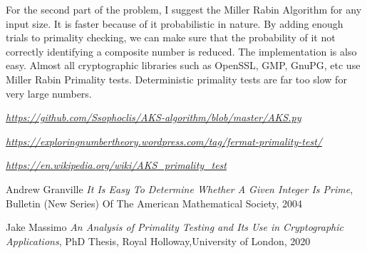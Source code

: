 \documentclass[11pt,a4paper]{article}
\begin{document}
\begin{enumerate}[1.]
\begin{flushleft}
            \bigbreak
            For the second part of the problem, I suggest the Miller Rabin Algorithm for any input size. It is faster because of it probabilistic in nature. By adding enough trials to primality checking, we can make sure that the probability of it not correctly identifying a composite number is reduced. The implementation is also easy. Almost all cryptographic libraries such as OpenSSL, GMP, GnuPG, etc use Miller Rabin Primality tests. Deterministic primality tests are far too slow for very large numbers.
        \end{flushleft}
	\end{enumerate}

	\begin{thebibliography}{unsrt}

		\emph{\url{https://github.com/Ssophoclis/AKS-algorithm/blob/master/AKS.py}}

        \emph{\url{https://exploringnumbertheory.wordpress.com/tag/fermat-primality-test/}}

        \emph{\url{https://en.wikipedia.org/wiki/AKS_primality_test}}

        Andrew Granville \emph{It Is Easy To Determine Whether A Given Integer Is Prime}, Bulletin (New Series) Of The American Mathematical Society, 2004

        Jake Massimo \emph{An Analysis of Primality Testing and Its Use in Cryptographic Applications}, PhD Thesis, Royal Holloway,University of London, 2020
	\end{thebibliography}
\end{document}
